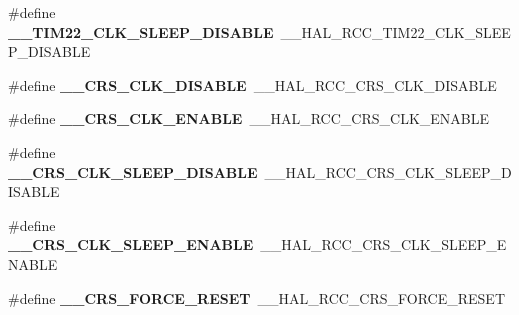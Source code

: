 \begin{DoxyCompactItemize}
\item 
\hypertarget{group___h_a_l___r_c_c___aliased_gaa0747e8119f9798cffed35b6312a90ca}{\#define {\bfseries \-\_\-\-\_\-\-T\-I\-M22\-\_\-\-C\-L\-K\-\_\-\-S\-L\-E\-E\-P\-\_\-\-D\-I\-S\-A\-B\-L\-E}~\-\_\-\-\_\-\-H\-A\-L\-\_\-\-R\-C\-C\-\_\-\-T\-I\-M22\-\_\-\-C\-L\-K\-\_\-\-S\-L\-E\-E\-P\-\_\-\-D\-I\-S\-A\-B\-L\-E}\label{group___h_a_l___r_c_c___aliased_gaa0747e8119f9798cffed35b6312a90ca}

\item 
\hypertarget{group___h_a_l___r_c_c___aliased_ga84ae58b90f4c98fd88358a01820a8758}{\#define {\bfseries \-\_\-\-\_\-\-C\-R\-S\-\_\-\-C\-L\-K\-\_\-\-D\-I\-S\-A\-B\-L\-E}~\-\_\-\-\_\-\-H\-A\-L\-\_\-\-R\-C\-C\-\_\-\-C\-R\-S\-\_\-\-C\-L\-K\-\_\-\-D\-I\-S\-A\-B\-L\-E}\label{group___h_a_l___r_c_c___aliased_ga84ae58b90f4c98fd88358a01820a8758}

\item 
\hypertarget{group___h_a_l___r_c_c___aliased_ga52eccec80baca3fd78a15dd06cd38e26}{\#define {\bfseries \-\_\-\-\_\-\-C\-R\-S\-\_\-\-C\-L\-K\-\_\-\-E\-N\-A\-B\-L\-E}~\-\_\-\-\_\-\-H\-A\-L\-\_\-\-R\-C\-C\-\_\-\-C\-R\-S\-\_\-\-C\-L\-K\-\_\-\-E\-N\-A\-B\-L\-E}\label{group___h_a_l___r_c_c___aliased_ga52eccec80baca3fd78a15dd06cd38e26}

\item 
\hypertarget{group___h_a_l___r_c_c___aliased_ga109eb744a73866e3b6acd86d7a3078b6}{\#define {\bfseries \-\_\-\-\_\-\-C\-R\-S\-\_\-\-C\-L\-K\-\_\-\-S\-L\-E\-E\-P\-\_\-\-D\-I\-S\-A\-B\-L\-E}~\-\_\-\-\_\-\-H\-A\-L\-\_\-\-R\-C\-C\-\_\-\-C\-R\-S\-\_\-\-C\-L\-K\-\_\-\-S\-L\-E\-E\-P\-\_\-\-D\-I\-S\-A\-B\-L\-E}\label{group___h_a_l___r_c_c___aliased_ga109eb744a73866e3b6acd86d7a3078b6}

\item 
\hypertarget{group___h_a_l___r_c_c___aliased_ga021f37b26826b71eb190799dca3c9c8e}{\#define {\bfseries \-\_\-\-\_\-\-C\-R\-S\-\_\-\-C\-L\-K\-\_\-\-S\-L\-E\-E\-P\-\_\-\-E\-N\-A\-B\-L\-E}~\-\_\-\-\_\-\-H\-A\-L\-\_\-\-R\-C\-C\-\_\-\-C\-R\-S\-\_\-\-C\-L\-K\-\_\-\-S\-L\-E\-E\-P\-\_\-\-E\-N\-A\-B\-L\-E}\label{group___h_a_l___r_c_c___aliased_ga021f37b26826b71eb190799dca3c9c8e}

\item 
\hypertarget{group___h_a_l___r_c_c___aliased_ga9e67e2882448dc0477a13ff77b08ae93}{\#define {\bfseries \-\_\-\-\_\-\-C\-R\-S\-\_\-\-F\-O\-R\-C\-E\-\_\-\-R\-E\-S\-E\-T}~\-\_\-\-\_\-\-H\-A\-L\-\_\-\-R\-C\-C\-\_\-\-C\-R\-S\-\_\-\-F\-O\-R\-C\-E\-\_\-\-R\-E\-S\-E\-T}\label{group___h_a_l___r_c_c___aliased_ga9e67e2882448dc0477a13ff77b08ae93}


\end{DoxyCompactItemize}
